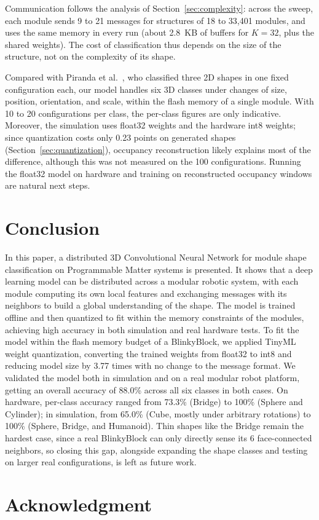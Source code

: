 \documentclass[12pt]{article}
\begin{document}
Communication follows the analysis of Section~\ref{sec:complexity}: across the sweep, each module sends 9 to 21 messages for structures of 18 to 33{,}401 modules, and uses the same memory in every run (about 2.8~KB of buffers for $K=32$, plus the shared weights). The cost of classification thus depends on the size of the structure, not on the complexity of its shape.

Compared with Piranda et al.~\cite{piranda2024ai4pm}, who classified three 2D shapes in one fixed configuration each, our model handles six 3D classes under changes of size, position, orientation, and scale, within the flash memory of a single module. With 10 to 20 configurations per class, the per-class figures are only indicative. Moreover, the simulation uses float32 weights and the hardware int8 weights; since quantization costs only 0.23 points on generated shapes (Section~\ref{sec:quantization}), occupancy reconstruction likely explains most of the difference, although this was not measured on the 100 configurations. Running the float32 model on hardware and training on reconstructed occupancy windows are natural next steps.

\section{Conclusion}
\label{sec:conclusion}

In this paper, a distributed 3D Convolutional Neural Network for module shape classification on Programmable Matter systems is presented. It shows that a deep learning model can be distributed across a modular robotic system, with each module computing its own local features and exchanging messages with its neighbors to build a global understanding of the shape. The model is trained offline and then quantized to fit within the memory constraints of the modules, achieving high accuracy in both simulation and real hardware tests. To fit the model within the flash memory budget of a BlinkyBlock, we applied TinyML weight quantization, converting the trained weights from float32 to int8 and reducing model size by 3.77 times with no change to the message format. We validated the model both in simulation and on a real modular robot platform, getting an overall accuracy of 88.0\% across all six classes in both cases. On hardware, per-class accuracy ranged from 73.3\% (Bridge) to 100\% (Sphere and Cylinder); in simulation, from 65.0\% (Cube, mostly under arbitrary rotations) to 100\% (Sphere, Bridge, and Humanoid). Thin shapes like the Bridge remain the hardest case, since a real BlinkyBlock can only directly sense its 6 face-connected neighbors, so closing this gap, alongside expanding the shape classes and testing on larger real configurations, is left as future work.

\section*{Acknowledgment}



\end{document}
